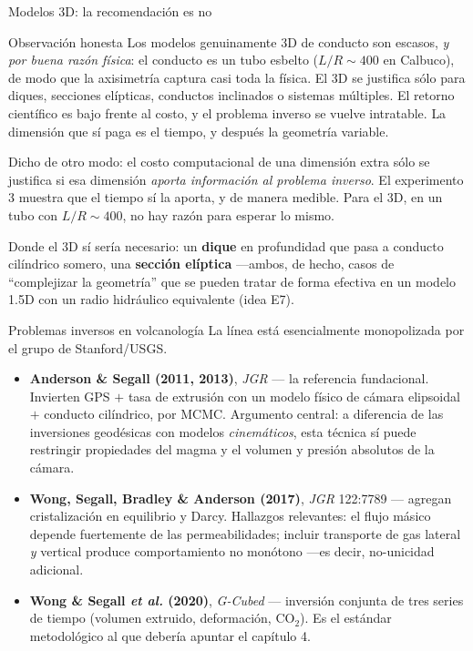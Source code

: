 \documentclass[aspectratio=169,10pt,t]{beamer}
\begin{document}
\begin{frame}{Modelos 3D: la recomendación es no}
\begin{alertblock}{Observación honesta}
Los modelos genuinamente 3D de conducto son escasos, \emph{y por buena razón
física}: el conducto es un tubo esbelto ($L/R\sim400$ en Calbuco), de modo que la
axisimetría captura casi toda la física. El 3D se justifica sólo para diques,
secciones elípticas, conductos inclinados o sistemas múltiples. El retorno
científico es bajo frente al costo, y el problema inverso se vuelve intratable.
\alert{La dimensión que sí paga es el tiempo, y después la geometría variable.}
\end{alertblock}

\medskip
Dicho de otro modo: el costo computacional de una dimensión extra sólo se
justifica si esa dimensión \emph{aporta información al problema inverso}. El
experimento 3 muestra que el tiempo sí la aporta, y de manera medible. Para el
3D, en un tubo con $L/R\sim400$, no hay razón para esperar lo mismo.

\medskip
\small Donde el 3D sí sería necesario: un \textbf{dique} en profundidad que pasa
a conducto cilíndrico somero, una \textbf{sección elíptica} —ambos, de hecho,
casos de ``complejizar la geometría'' que se pueden tratar de forma efectiva en
un modelo 1.5D con un radio hidráulico equivalente (idea E7).
\end{frame}

\begin{frame}{Problemas inversos en volcanología}
La línea está esencialmente monopolizada por el grupo de Stanford/USGS.
\smallskip
\small
\begin{itemize}
  \item \textbf{Anderson \& Segall (2011, 2013)}, \emph{JGR} — la referencia
    fundacional. Invierten GPS $+$ tasa de extrusión con un modelo físico de
    cámara elipsoidal $+$ conducto cilíndrico, por MCMC. Argumento central: a
    diferencia de las inversiones geodésicas con modelos \emph{cinemáticos}, esta
    técnica \alert{sí} puede restringir propiedades del magma y el volumen y
    presión absolutos de la cámara.
  \item \textbf{Wong, Segall, Bradley \& Anderson (2017)}, \emph{JGR} 122:7789 —
    agregan cristalización en equilibrio y Darcy. Hallazgos relevantes: el flujo
    másico \alert{depende fuertemente de las permeabilidades}; incluir transporte
    de gas lateral \emph{y} vertical produce comportamiento \alert{no monótono}
    —es decir, no-unicidad adicional.
  \item \textbf{Wong \& Segall \emph{et al.} (2020)}, \emph{G-Cubed} — inversión
    conjunta de \alert{tres series de tiempo} (volumen extruido, deformación,
    CO$_2$). Es el estándar metodológico al que debería apuntar el capítulo 4.
\end{itemize}
\end{frame}
\end{document}
